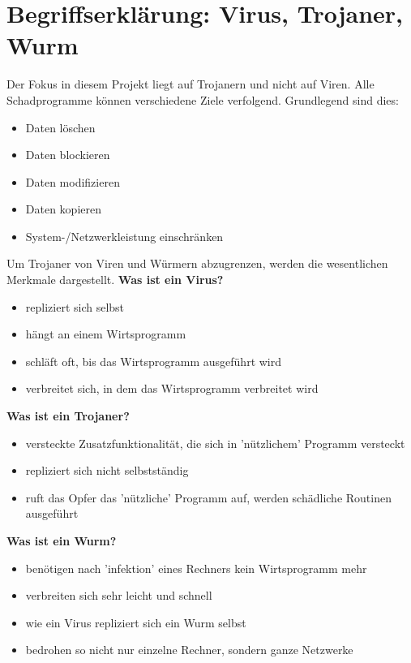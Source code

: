\section{Begriffserklärung: Virus, Trojaner, Wurm}\label{sec:abgrenzung}
Der Fokus in diesem Projekt liegt auf Trojanern und nicht auf Viren. Alle Schadprogramme können verschiedene Ziele verfolgend. 
Grundlegend sind dies: 
\begin{itemize}
    \item Daten löschen
    \item Daten blockieren
    \item Daten modifizieren
    \item Daten kopieren
    \item System-/Netzwerkleistung einschränken
\end{itemize} 
Um Trojaner von Viren und Würmern abzugrenzen, werden die wesentlichen Merkmale dargestellt.
\cite{KASTRO}
\break
\textbf{Was ist ein Virus?}
\begin{itemize}
    \item repliziert sich selbst
    \item hängt an einem Wirtsprogramm
    \item schläft oft, bis das Wirtsprogramm ausgeführt wird
    \item verbreitet sich, in dem das Wirtsprogramm verbreitet wird
\end{itemize}
\textbf{Was ist ein Trojaner?}
\begin{itemize}
    \item versteckte Zusatzfunktionalität, die sich in 'nützlichem' Programm versteckt
    \item repliziert sich nicht selbstständig
    \item ruft das Opfer das 'nützliche' Programm auf, werden schädliche Routinen ausgeführt
\end{itemize}
\textbf{Was ist ein Wurm?}
\begin{itemize}
    \item benötigen nach 'infektion' eines Rechners kein Wirtsprogramm mehr
    \item verbreiten sich sehr leicht und schnell
    \item wie ein Virus repliziert sich ein Wurm selbst
    \item bedrohen so nicht nur einzelne Rechner, sondern ganze Netzwerke
\end{itemize}
\cite{ABGVT}